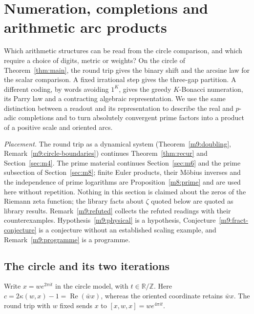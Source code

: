 \documentclass[11pt,reqno]{amsart}
\theoremstyle{definition}
\theoremstyle{remark}
\numberwithin{equation}{section}
\newcommand{\R}{\mathbb{R}}
\newcommand{\Z}{\mathbb{Z}}
\newcommand{\re}{\operatorname{Re}}
\newcommand{\hp}[3]{[#1,#2,#3]}
\begin{document}
\section{Numeration, completions and arithmetic arc products}\label{sec:m9}

Which arithmetic structures can be read from the circle comparison, and
which require a choice of digits, metric or weights? On the circle of
Theorem~\ref{thm:main}, the round trip gives the binary shift and the
arcsine law for the scalar comparison. A fixed irrational step gives
the three-gap partition. A different coding, by words avoiding \(1^K\),
gives the greedy \(K\)-Bonacci numeration, its Parry law and a
contracting algebraic representation. We use the same distinction
between a readout and its representation to describe the real and
\(p\)-adic completions and to turn absolutely convergent prime factors
into a product of a positive scale and oriented arcs.

\emph{Placement.} The round trip as a dynamical system
(Theorem~\ref{m9:doubling}, Remark~\ref{m9:circle-boundaries}) continues
Theorem~\ref{thm:recur} and Section~\ref{sec:m4}. The prime material
continues Section~\ref{sec:m6} and the prime subsection of
Section~\ref{sec:m8}; finite Euler products, their M\"obius inverses and the
independence of prime logarithms are Proposition~\ref{m8:prime} and are used
here without repetition. Nothing in this section is claimed about the zeros
of the Riemann zeta function; the library facts about $\zeta$ quoted below
are quoted as library results. Remark~\ref{m9:refuted} collects the refuted
readings with their counterexamples. Hypothesis~\ref{m9:physical} is a
hypothesis, Conjecture~\ref{m9:fract-conjecture} is a conjecture without an
established scaling example, and Remark~\ref{m9:programme} is a programme.

\subsection{The circle and its two iterations}

Write \(x=w e^{2\pi i t}\) in the circle model, with \(t\in\R/\Z\).
Here \(c=2\kappa(w,x)-1=\re(\bar wx)\), whereas the oriented coordinate
retains \(\bar wx\). The round trip with \(w\) fixed sends \(x\) to
\(\hp{x}{w}{x}=w e^{4\pi i t}\).
\end{document}
